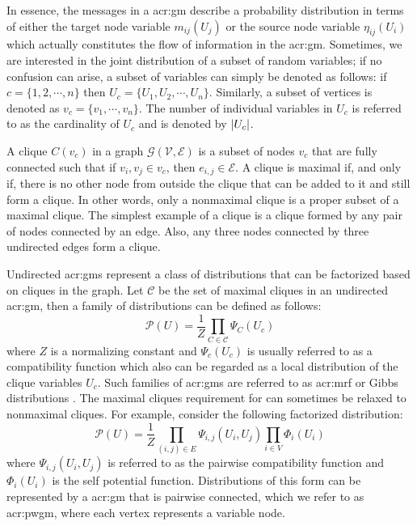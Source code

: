 In essence, the messages in a \gls{acr:gm} describe a probability distribution in terms of either the target node variable $m_{ij}(U_j)$ or the source node variable $\eta_{ij}(U_i)$ which actually constitutes the flow of information in the \gls{acr:gm}.
Sometimes, we are interested in the joint distribution of a subset of random variables; if no confusion can arise, a subset of variables can simply be denoted as follows: if $c=\{1,2,\cdots,n\}$ then $U_c=\{U_1,U_2,\cdots,U_n\}$.
Similarly, a subset of vertices is denoted as $v_c=\{v_1,\cdots,v_n\}$.
The number of individual variables in $U_c$ is referred to as the cardinality of $U_c$ and is denoted by $\left\vert{U_c}\right\vert$.


A clique $C(v_c)$ in a graph $\mathcal{G}(\mathcal{V},\mathcal{E})$ is a subset of nodes $v_c$ that are fully connected such that if $v_i,v_j \in v_c$, then $e_{i,j} \in \mathcal{E}$.
A clique is maximal if, and only if, there is no other node from outside the clique that can be added to it and still form a clique.
In other words, only a nonmaximal clique is a proper subset of a maximal clique.
The simplest example of a clique is a clique formed by any pair of nodes connected by an edge.
Also, any three nodes connected by three undirected edges form a clique. 


Undirected \glspl{acr:gm} represent a class of distributions that can be factorized based on cliques in the graph.
Let $\mathcal{C}$ be the set of maximal cliques in an undirected \gls{acr:gm},  then a family of distributions can be defined as follows:
\begin{equation}
	\mathcal{P}(U) = \frac{1}{Z} \prod_{C \in \mathcal{C}} \Psi_C(U_c) \label{eqn:maxcliqP}
\end{equation}
where $Z$ is a normalizing constant and $\Psi_c(U_c)$ is usually referred to as a compatibility function which also can be regarded as a local distribution of the clique variables $U_c$.
Such families of \glspl{acr:gm} are referred to as \gls{acr:mrf} or Gibbs distributions \cite{bib:Wainwright2008GMEFAVI}.
The maximal cliques requirement for  can sometimes be relaxed to nonmaximal cliques.
For example, consider the following factorized distribution:
\begin{equation}
	\mathcal{P}(U) = \frac{1}{Z} \prod_{(i,j) \in E} \Psi_{i,j}(U_i,U_j) \prod_{i \in V} \Phi_i(U_i) \label{eqn:pwcliqP}
\end{equation}
where $\Psi_{i,j}(U_i,U_j)$ is referred to as the pairwise compatibility function and $\Phi_i(U_i)$ is the self potential function.
Distributions of this form can be represented by a \gls{acr:gm} that is pairwise connected, which we refer to as \gls{acr:pwgm}, where each vertex represents a variable node.


